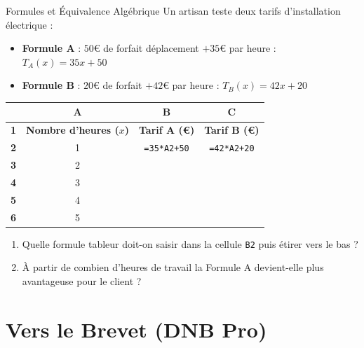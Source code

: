 \begin{tpinfo}{Formules et Équivalence Algébrique}
Un artisan teste deux tarifs d'installation électrique :
\begin{itemize}
    \item \textbf{Formule A} : $50\euro$ de forfait déplacement $+ 35\euro$ par heure : $T_A(x) = 35x + 50$
    \item \textbf{Formule B} : $20\euro$ de forfait $+ 42\euro$ par heure : $T_B(x) = 42x + 20$
\end{itemize}

\begin{center}
\begin{tabular}{|c|c|c|c|}
\hline
\rowcolor{slate200} & \textbf{A} & \textbf{B} & \textbf{C} \\
\hline
\textbf{1} & \textbf{Nombre d'heures ($x$)} & \textbf{Tarif A (\euro)} & \textbf{Tarif B (\euro)} \\
\hline
\textbf{2} & 1 & \texttt{=35*A2+50} & \texttt{=42*A2+20} \\
\hline
\textbf{3} & 2 & & \\
\hline
\textbf{4} & 3 & & \\
\hline
\textbf{5} & 4 & & \\
\hline
\textbf{6} & 5 & & \\
\hline
\end{tabular}
\end{center}

\begin{enumerate}
    \item Quelle formule tableur doit-on saisir dans la cellule \texttt{B2} puis étirer vers le bas ?
    \item À partir de combien d'heures de travail la Formule A devient-elle plus avantageuse pour le client ?
\end{enumerate}
\lignesreponse[3]
\end{tpinfo}

\section{Vers le Brevet (DNB Pro)}

